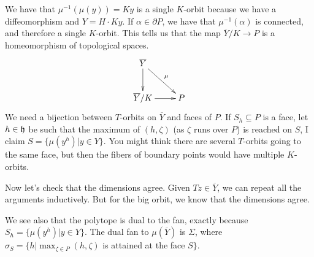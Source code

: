 We have that $\mu^{-1}(\mu(y))=Ky$ is a single $K$-orbit because we have a diffeomorphism and $Y=H\cdot Ky$. If $\alpha\in \partial P$, we have that $\mu^{-1}(\alpha)$ is connected, and therefore a single $K$-orbit. This tells us that the map $\overline Y/K\to P$ is a homeomorphism of topological spaces.
\[\xymatrix{
 \overline Y\ar[d]\ar[dr]^\mu\\
 \overline Y/K\ar[r] & P
}\]
We need a bijection between $T$-orbits on $\overline Y$ and faces of $P$. If $S_h\subseteq P$ is a face, let $h\in \mathfrak{h}$ be such that the maximum of $(h,\zeta)$ (as $\zeta$ runs over $P$) is reached on $S$, I claim $S=\{\mu(y^h)|y\in Y\}$. You might think there are several $T$-orbits going to the same face, but then the fibers of boundary points would have multiple $K$-orbits.

Now let's check that the dimensions agree. Given $Tz\in \overline Y$, we can repeat all the arguments inductively. But for the big orbit, we know that the dimensions agree.

We see also that the polytope is dual to the fan, exactly because $S_h=\{\mu(y^h)|y\in Y\}$. The dual fan to $\mu(\overline Y)$ is $\Sigma$, where $\sigma_S=\{h|\max_{\zeta\in P}(h,\zeta)$ is attained at the face $S\}$.


